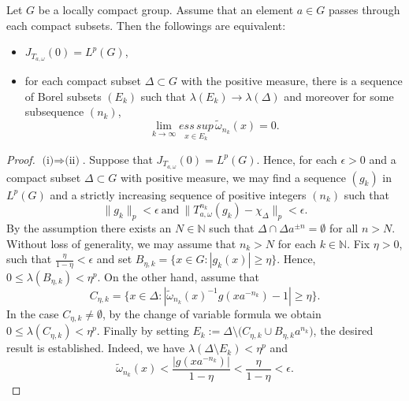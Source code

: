 \documentclass[10pt,a4paper]{amsart}
\begin{document}
\begin{thm}\label{t3}
Let $G$ be a  locally compact group. Assume that  an element $a\in
G$ passes through  each compact subsets.  Then the followings are
equivalent:
\begin{itemize}
  \item [(i)] $J_{T_{a,\omega}}(0)=L^p(G)$,
  \item [(ii)] for each compact subset $\Delta
\subset G$ with the positive measure,
  there is a sequence of Borel subsets $(E_k)$ such
that $\lambda(E_k)\to\lambda(\Delta)$ and moreover for some
subsequence $(n_k)$,
$$
\lim_{k\rightarrow \infty}\underset{x\in E_{k}}{ess\,sup}\,
\tilde{\omega}_{n_k}(x)=0.
$$
\end{itemize}
\end{thm}

\begin{proof}
$\mbox{(i)}\Rightarrow \mbox{(ii)}$. Suppose that $J_{T_{a,\omega}}(0)=L^p(G)$.
Hence, for each $\epsilon>0$ and a compact subset $\Delta\subset G$ with positive measure,
we may find a sequence $(g_k)$ in $L^p(G)$ and a strictly increasing sequence of
positive integers $(n_k)$ such that $$\|g_k \|_p <\epsilon ~ \text{
and}~  \|T_{a,\omega}^{n_k}(g_k)-\chi_\Delta\|_p<\epsilon.$$
By the assumption
there exists an $N\in\mathbb{N}$ such that $\Delta \cap \Delta
a^{\pm n}=\emptyset$ for all $n>N$. Without loss of generality, we
may assume that $n_k>N$ for each $k\in \mathbb{N}$.
 Fix  $ \eta> 0$, such that $\frac{\eta}{1-\eta}<\epsilon$
and set $B_{\eta,k}=\{x\in G: |g_k(x)|\geq\eta\}$.
Hence, $0\leq\lambda(B_{\eta,k})<\eta^p$. On the other hand, assume that
$$C_{\eta,k}=\{x\in\Delta:|\tilde{\omega}_{n_k}(x)^{-1}g(xa^{-n_k})-1|\geq\eta\}.$$
In the case $C_{\eta,k}\neq \emptyset$, by the
change of variable formula  we obtain $0\leq\lambda(C_{\eta,k})<\eta^p$.
Finally by setting $E_k:=\Delta\setminus \big(C_{\eta,k}\cup
B_{\eta,k}a^{n_k}\big)$, the desired result is established. Indeed,
we have $\lambda(\Delta\setminus E_k)<\eta^p$ and
$$
\tilde{\omega}_{n_k}(x)<\frac{|g(xa^{-n_k})|}{1-\eta}
<\frac{\eta}{1-\eta}<\epsilon.
$$





\end{proof}
\end{document}
